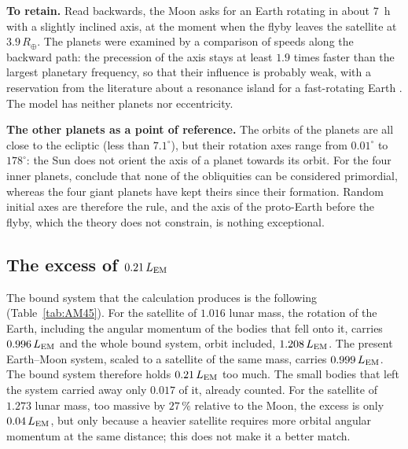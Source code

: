 \documentclass[11pt,a4paper]{article}
\newcommand{\Rt}{\ensuremath{R_\oplus}}
\newcommand{\LEM}{\ensuremath{L_{\rm EM}}}
\begin{document}
\textbf{To retain.} Read backwards, the Moon asks for an Earth rotating in about $7$~h with a slightly inclined axis, at the moment when the flyby leaves the satellite at $3.9\,\Rt$. The planets were examined by a comparison of speeds along the backward path: the precession of the axis stays at least $1.9$ times faster than the largest planetary frequency, so that their influence is probably weak, with a reservation from the literature about a resonance island for a fast-rotating Earth \citep{LaskarJoutelRobutel1993}. The model has neither planets nor eccentricity.

\textbf{The other planets as a point of reference.} The orbits of the planets are all close to the ecliptic (less than $7.1^\circ$), but their rotation axes range from $0.01^\circ$ to $178^\circ$: the Sun does not orient the axis of a planet towards its orbit. For the four inner planets, \citet{LaskarRobutel1993} conclude that none of the obliquities can be considered primordial, whereas the four giant planets have kept theirs since their formation. Random initial axes are therefore the rule, and the axis of the proto-Earth before the flyby, which the theory does not constrain, is nothing exceptional.

\subsection{The excess of $0.21\,\LEM$}
\label{sec:excess}

The bound system that the calculation produces is the following (Table~\ref{tab:AM45}). For the satellite of $1.016$ lunar mass, the rotation of the Earth, including the angular momentum of the bodies that fell onto it, carries $0.996\,\LEM$ and the whole bound system, orbit included, $1.208\,\LEM$. The present Earth--Moon system, scaled to a satellite of the same mass, carries $0.999\,\LEM$. The bound system therefore holds $0.21\,\LEM$ too much. The small bodies that left the system carried away only $0.017$ of it, already counted. For the satellite of $1.273$ lunar mass, too massive by $27\,\%$ relative to the Moon, the excess is only $0.04\,\LEM$, but only because a heavier satellite requires more orbital angular momentum at the same distance; this does not make it a better match.
\end{document}
